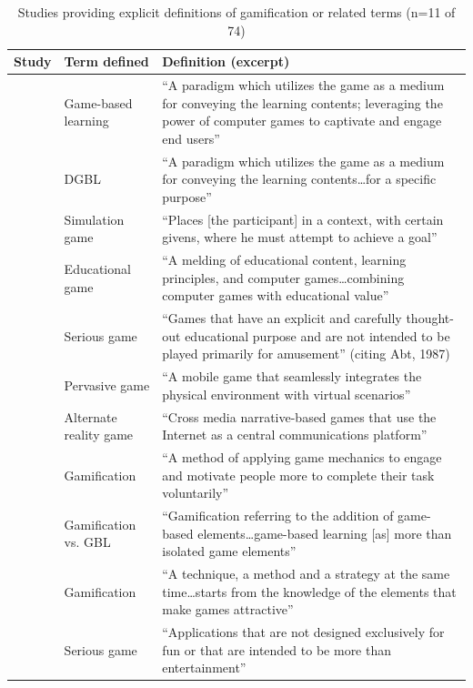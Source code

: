 \begin{table}[!h]
\centering
\caption{Studies providing explicit definitions of gamification or related terms (n=11 of 74)}
\label{tab:explicit-definitions}
\small
\begin{tabular}{p{3cm}p{2.5cm}p{7cm}}
\hline
\textbf{Study} & \textbf{Term defined} & \textbf{Definition (excerpt)} \\
\hline
\citeauthor{30Zin2008}~\cite{30Zin2008} & Game-based learning & ``A paradigm which utilizes the game as a medium for conveying the learning contents; leveraging the power of computer games to captivate and engage end users'' \\
\citeauthor{23Zin2009322}~\cite{23Zin2009322} & DGBL & ``A paradigm which utilizes the game as a medium for conveying the learning contents\ldots for a specific purpose'' \\
\citeauthor{76Corbeil2011462}~\cite{76Corbeil2011462} & Simulation game & ``Places [the participant] in a context, with certain givens, where he must attempt to achieve a goal'' \\
\citeauthor{65Razak201139}~\cite{65Razak201139} & Educational game & ``A melding of educational content, learning principles, and computer games\ldots combining computer games with educational value'' \\
\citeauthor{42Huffer201581}~\cite{42Huffer201581} & Serious game & ``Games that have an explicit and carefully thought-out educational purpose and are not intended to be played primarily for amusement'' (citing Abt, 1987) \\
\citeauthor{58Shih2015173}~\cite{58Shih2015173} & Pervasive game & ``A mobile game that seamlessly integrates the physical environment with virtual scenarios'' \\
\citeauthor{71lynch2015pedagogical}~\cite{71lynch2015pedagogical} & Alternate reality game & ``Cross media narrative-based games that use the Internet as a central communications platform'' \\
\citeauthor{43ali2021indonesian}~\cite{43ali2021indonesian} & Gamification & ``A method of applying game mechanics to engage and motivate people more to complete their task voluntarily'' \\
\citeauthor{36Scholz2021}~\cite{36Scholz2021} & Gamification vs. GBL & ``Gamification referring to the addition of game-based elements\ldots game-based learning [as] more than isolated game elements'' \\
\citeauthor{34Serrano2023}~\cite{34Serrano2023} & Gamification & ``A technique, a method and a strategy at the same time\ldots starts from the knowledge of the elements that make games attractive'' \\
\citeauthor{41Petersen2023301}~\cite{41Petersen2023301} & Serious game & ``Applications that are not designed exclusively for fun or that are intended to be more than entertainment'' \\
\hline
\end{tabular}
\end{table}


